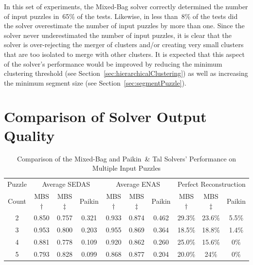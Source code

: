 In this set of experiments, the Mixed-Bag solver correctly determined the number of input puzzles in~65\% of the tests.  Likewise, in less than~8\% of the tests did the solver overestimate the number of input puzzles by more than one.  Since the solver never underestimated the number of input puzzles, it is clear that the solver is over-rejecting the merger of clusters and/or creating very small clusters that are too isolated to merge with other clusters.  It is expected that this aspect of the solver's performance would be improved by reducing the minimum clustering threshold (see Section~\ref{sec:hierarchicalClustering}) as well as increasing the minimum segment size (see Section~\ref{sec:segmentPuzzle}). 

\section{Comparison of Solver Output Quality}\label{sec:comparisonOfSolverOutputQuality}


\begin{table}[tb]
\begin{center}
\begin{tabular}{ c||c|c|c||c|c|c||c|c|c } 
 \toprule
 Puzzle & \multicolumn{3}{c||}{Average SEDAS} & \multicolumn{3}{c||}{Average ENAS} & \multicolumn{3}{c}{Perfect Reconstruction} \\ \cline{2-10}
 Count & MBS$\dagger$ & MBS$\ddagger$ & Paikin & MBS$\dagger$ & MBS$\ddagger$ & Paikin & MBS$\dagger$ & MBS$\ddagger$ & Paikin \\ 
 \hline \hline
 
	2 & 0.850 & 0.757 & 0.321 & 0.933 & 0.874 & 0.462 & 29.3\% & 23.6\% & 5.5\% \\ \hline
 
	3 & 0.953 & 0.800 & 0.203 & 0.955 & 0.869 & 0.364 & 18.5\% & 18.8\% & 1.4\% \\ \hline
  
	4 & 0.881 & 0.778 & 0.109 & 0.920 & 0.862 & 0.260 & 25.0\% & 15.6\% & 0\% \\ \hline
  
	5 & 0.793 & 0.828 & 0.099 & 0.868 & 0.877 & 0.204 & 20.0\% & 24\% & 0\% \\ 
 \bottomrule
\end{tabular}
\end{center}
\caption{Comparison of the Mixed-Bag and Paikin~\& Tal Solvers' Performance on Multiple Input Puzzles}\label{tab:tableSolverPerformanceComparison}
\end{table}

